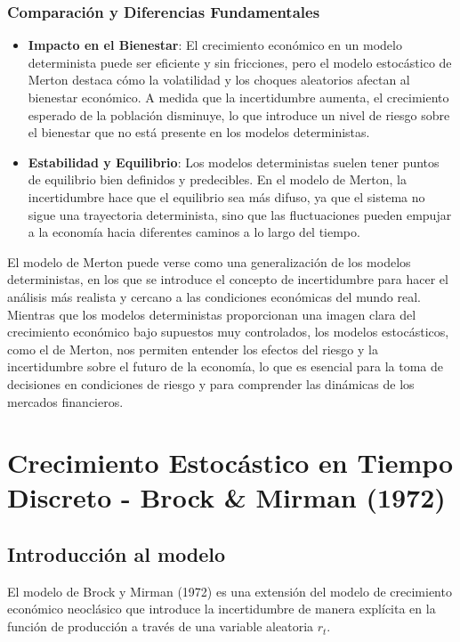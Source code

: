 \documentclass[a4paper,12pt]{article}
\begin{document}
	\subsubsection{Comparación y Diferencias Fundamentales}
	\begin{itemize}
		
		\item \textbf{Impacto en el Bienestar}: El crecimiento económico en un modelo determinista puede ser eficiente y sin fricciones, pero el modelo estocástico de Merton destaca cómo la volatilidad y los choques aleatorios afectan al bienestar económico. A medida que la incertidumbre aumenta, el crecimiento esperado de la población disminuye, lo que introduce un nivel de riesgo sobre el bienestar que no está presente en los modelos deterministas.
		
		\item \textbf{Estabilidad y Equilibrio}: Los modelos deterministas suelen tener puntos de equilibrio bien definidos y predecibles. En el modelo de Merton, la incertidumbre hace que el equilibrio sea más difuso, ya que el sistema no sigue una trayectoria determinista, sino que las fluctuaciones pueden empujar a la economía hacia diferentes caminos a lo largo del tiempo.
	\end{itemize}

	El modelo de Merton puede verse como una generalización de los modelos deterministas, en los que se introduce el concepto de incertidumbre para hacer el análisis más realista y cercano a las condiciones económicas del mundo real. Mientras que los modelos deterministas proporcionan una imagen clara del crecimiento económico bajo supuestos muy controlados, los modelos estocásticos, como el de Merton, nos permiten entender los efectos del riesgo y la incertidumbre sobre el futuro de la economía, lo que es esencial para la toma de decisiones en condiciones de riesgo y para comprender las dinámicas de los mercados financieros.
	

	\section{Crecimiento Estocástico en Tiempo Discreto - Brock \& Mirman (1972)}
	
	\subsection{Introducción al modelo}
	El modelo de Brock y Mirman (1972) es una extensión del modelo de crecimiento económico neoclásico que introduce la incertidumbre de manera explícita en la función de producción a través de una variable aleatoria \( r_t \). 	
	
\end{document}
